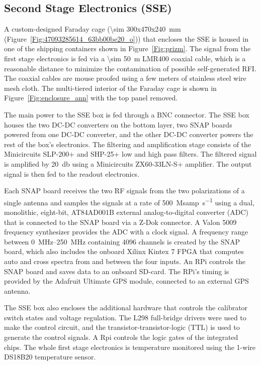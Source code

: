 \subsection{Second Stage Electronics (SSE)}

A custom-designed Faraday cage (\SI{\sim 300x470x240}{\milli \meter} (Figure~\ref{Fig:47093285614_63bb00be20_o})) that encloses the SSE is housed in one of the shipping containers shown in Figure~\ref{Fig:prizm}. The signal from the first stage electronics is fed via a \SI{\sim 50}{\meter} LMR400 coaxial cable, which is a reasonable distance to minimize the contamination of possible self-generated RFI. The coaxial cables are mouse proofed using a few meters of stainless steel wire mesh cloth. The multi-tiered interior of the Faraday cage is shown in Figure~\ref{Fig:enclosure_ann} with the top panel removed.

The main power to the SSE box is fed through a BNC connector. The SSE box houses the two DC-DC converters on the bottom layer, two SNAP boards powered from one DC-DC converter, and the other DC-DC converter powers the rest of the box's electronics. The filtering and amplification stage consists of the Minicircuits SLP-200+ and SHP-25+ low and high pass filters. The filtered signal is amplified by \SI{20}{\decibel} using a Minicircuits ZX60-33LN-S+ amplifier. The output signal is then fed to the readout electronics.

Each SNAP board receives the two RF signals from the two polarizations of a single antenna and samples the signals at a rate of \SI{500}{\mega samp\per \second} using a dual, monolithic, eight-bit, AT84AD001B external analog-to-digital converter (ADC) that is connected to the SNAP board via a Z-Dok connector. A Valon 5009 frequency synthesizer provides the ADC with a clock signal. A frequency range between \SIrange{0}{250}{\mega \hertz} containing 4096 channels is created by the SNAP board, which also includes the onboard Xilinx Kintex 7 FPGA that computes auto and cross spectra from and between the four inputs. An RPi controls the SNAP board and saves data to an onboard SD-card. The RPi's timing is provided by the Adafruit Ultimate GPS module, connected to an external GPS antenna.

The SSE box also encloses the additional hardware that controls the calibrator switch states and voltage regulation. The L298 full-bridge drivers were used to make the control circuit, and the transistor-transistor-logic (TTL) is used to generate the control signals. A Rpi controls the logic gates of the integrated chips. The whole first stage electronics is temperature monitored using the 1-wire DS18B20 temperature sensor. 

